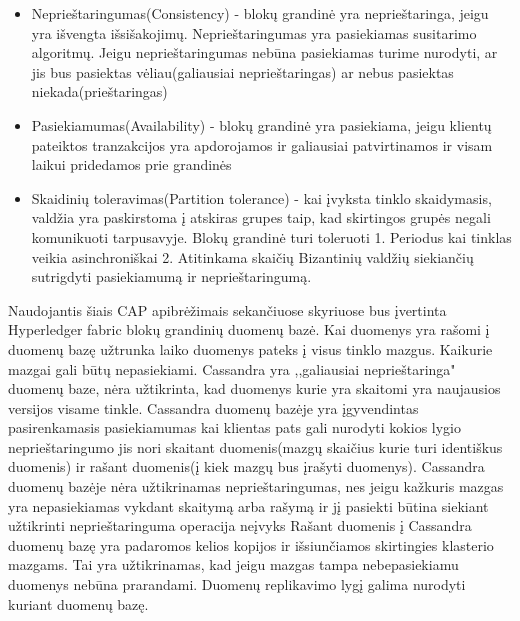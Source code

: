 \documentclass{VUMIFPSkursinis}
\begin{document}
		\begin{itemize}
			\item{Neprieštaringumas(Consistency) - blokų grandinė yra neprieštaringa, jeigu yra išvengta išsišakojimų. Neprieštaringumas yra pasiekiamas 
					susitarimo algoritmų. Jeigu neprieštaringumas nebūna pasiekiamas turime nurodyti, ar jis bus pasiektas vėliau(galiausiai neprieštaringas) ar nebus pasiektas niekada(prieštaringas) }
			\item{Pasiekiamumas(Availability) - blokų grandinė yra pasiekiama, jeigu klientų pateiktos tranzakcijos yra apdorojamos ir galiausiai patvirtinamos ir visam laikui pridedamos prie grandinės}
			\item{Skaidinių toleravimas(Partition tolerance) - kai įvyksta tinklo skaidymasis, valdžia yra paskirstoma į atskiras grupes taip, kad skirtingos grupės negali komunikuoti tarpusavyje. Blokų grandinė turi toleruoti 1. Periodus kai tinklas veikia asinchroniškai 2. Atitinkama skaičių Bizantinių valdžių siekiančių sutrigdyti pasiekiamumą ir neprieštaringumą.}
		\end{itemize}
		Naudojantis šiais CAP apibrėžimais sekančiuose skyriuose bus įvertinta Hyperledger fabric blokų grandinių duomenų bazė.
			Kai duomenys yra rašomi į duomenų bazę užtrunka laiko duomenys pateks į visus tinklo mazgus. Kaikurie mazgai gali būtų nepasiekiami. Cassandra yra ,,galiausiai neprieštaringa" duomenų baze, nėra užtikrinta, kad duomenys kurie yra skaitomi yra naujausios versijos visame tinkle. 
Cassandra duomenų bazėje yra įgyvendintas pasirenkamasis pasiekiamumas kai klientas pats gali nurodyti kokios lygio neprieštaringumo jis nori skaitant duomenis(mazgų skaičius kurie turi identiškus duomenis) ir rašant duomenis(į kiek mazgų bus įrašyti duomenys). Cassandra duomenų bazėje nėra užtikrinamas neprieštaringumas, nes jeigu kažkuris mazgas yra nepasiekiamas vykdant skaitymą arba rašymą ir jį pasiekti būtina siekiant užtikrinti neprieštaringuma operacija neįvyks 
			Rašant duomenis į Cassandra duomenų bazę yra padaromos kelios kopijos ir išsiunčiamos skirtingies klasterio mazgams. Tai yra užtikrinamas, kad jeigu mazgas tampa nebepasiekiamu duomenys nebūna prarandami.\cite{CasDesk} Duomenų replikavimo lygį galima nurodyti kuriant duomenų bazę. 
\end{document}
